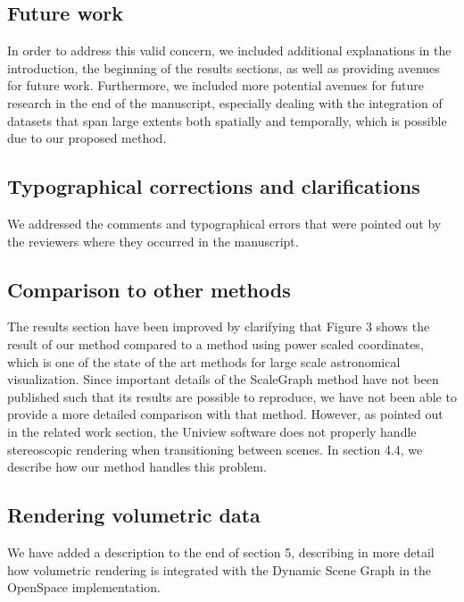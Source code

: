 \documentclass{article}
\begin{document}
\subsection{Future work}\label{concern:future-work}
In order to address this valid concern, we included additional explanations in the
introduction, the beginning of the results sections, as well as providing avenues for
future work. Furthermore, we included more potential avenues for future research in the
end of the manuscript, especially dealing with the integration of datasets that span large
extents both spatially and temporally, which is possible due to our proposed method.

\subsection{Typographical corrections and clarifications}\label{concern:typos}
We addressed the comments and typographical errors that were pointed out by the reviewers where they occurred in the manuscript.

\subsection{Comparison to other methods}\label{concern:comparisons}
The results section have been improved by clarifying that Figure 3 shows the result of our method compared to a method using power scaled coordinates, which is one of the state of the art methods for large scale astronomical visualization. Since important details of the ScaleGraph method have not been published such that its results are possible to reproduce, we have not been able to provide a more detailed comparison with that method. However, as pointed out in the related work section, the Uniview software does not properly handle stereoscopic rendering when transitioning between scenes. In section 4.4, we describe how our method handles this problem.

\subsection{Rendering volumetric data}\label{concern:volumetric}
We have added a description to the end of section 5, describing in more detail how volumetric rendering is integrated with the Dynamic Scene Graph in the OpenSpace implementation.
\end{document}
